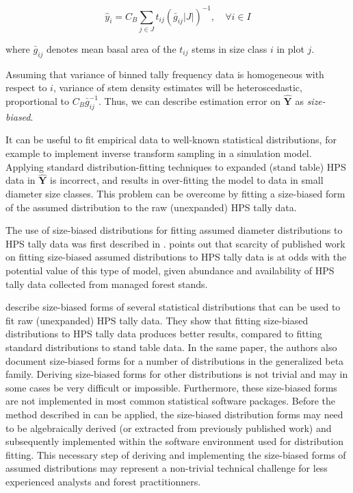 \message{ !name(hpsdistfit_article.tex)}\documentclass{article}
\begin{document}
\begin{equation*}
\hat{y}_i = C_B \sum_{j \in J} t_{ij}\left(\bar{g}_{ij}|J|\right)^{-1}, \quad \forall i \in I
\end{equation*}

where $\bar{g}_{ij}$ denotes mean basal area of the $t_{ij}$ stems in size class $i$ in plot $j$.

Assuming that variance of binned tally frequency data is homogeneous with respect to $i$, variance of stem density estimates will be heteroscedastic, proportional to $C_B\bar{g}_{ij}^{-1}$. 
Thus, we can describe estimation error on $\bm{\hat{Y}}$ as \emph{size-biased}.

It can be useful to fit empirical data to well-known statistical
distributions, for example to implement inverse transform sampling \citep{devroye1986nonuniform} in
a simulation model. 
Applying standard distribution-fitting techniques to expanded (stand
table) HPS data in $\bm{\hat{Y}}$ is incorrect, and results in
over-fitting the model to data in small diameter size classes.
This problem can be overcome by fitting a size-biased form of the
assumed distribution to the raw (unexpanded) HPS tally data. 

The use of size-biased distributions for fitting assumed diameter
distributions to HPS tally data was first described in
\citet{vandeusen1986fitting}.
\citet{gove2000some} points out that scarcity of published
work on fitting size-biased assumed distributions to HPS tally data is at odds with
the potential value of this type of model, given abundance and
availability of HPS tally data collected from managed forest stands.

\citet{ducey2015sizebiased} describe size-biased forms of several statistical distributions that can be used to fit raw (unexpanded) HPS tally data.
They show that fitting size-biased distributions to HPS tally data
produces better results, compared to fitting standard distributions to
stand table data.
In the same paper, the authors also document size-biased forms for a
number of distributions in the generalized beta family.
Deriving size-biased forms for other distributions is not trivial and
may in some cases be very difficult or impossible. 
Furthermore, these size-biased forms are not implemented in most common statistical software packages. 
Before the method described in \citet{ducey2015sizebiased} can be applied, the size-biased distribution forms may need to be algebraically derived (or
extracted from previously published work) and subsequently implemented within the software environment
used for distribution fitting.
This necessary step of deriving and
implementing the size-biased forms of assumed distributions may represent a
non-trivial technical challenge for less experienced analysts and
forest practitionners.
\end{document}

